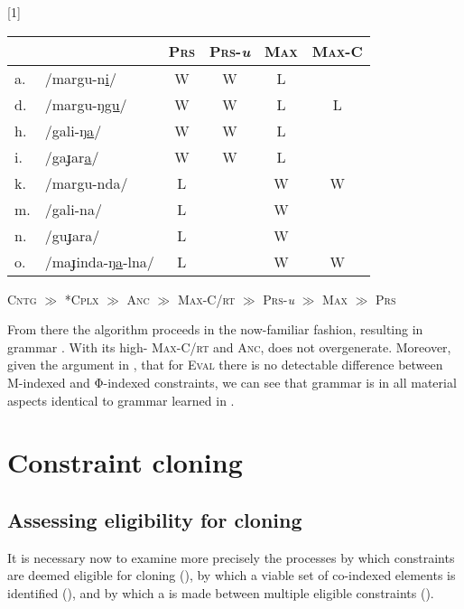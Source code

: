 \documentclass[output=paper,
modfonts
]{LSP/langsci}
\begin{document}
\ea \label{ex:round:49} 
\renewcommand*\arraystretch{1.15}
\scalebox{1}[1]{\begin{tabular}[t]{|ll||c|c||c|c|}
\firsthline  & & \textsc{Prs} & \textsc{Prs}-\textit{u} & \textsc{Max} & \textsc{Max-C} \\
\hline a. & /margu-n\underline{i}/ & W & W &  L & \\
\hline d. & /margu-ŋ\underline{gu}/ & W & W & L & L\\
\hline h. & /gali-ŋ\underline{a}/  & W & W & L & \\
\hline i. & /gaɟar\underline{a}/ & W & W & L & \\
\hline k. & /margu-nda/ &  L & & W & W\\
\hline m. & /gali-na/ &  L & & W & \\
\hline n. & /guɟara/ & L & & W & \\
\hline o. & /maɟinda-ŋ\underline{a}-lna/ & L & & W & W\\
\hline \end{tabular}} \renewcommand*\arraystretch{1}
\z

\ea \label{ex:round:50}
\textsc{Cntg} \textsc{${\gg}$}\textsc{} \textsc{*Cplx} \textsc{${\gg}$} \textsc{Anc} \textsc{${\gg}$} \textsc{Max-C/rt} \textsc{${\gg}$}\textsc{} \textsc{Prs-}\textit{u} ${\gg}$ \textsc{Max} \textsc{${\gg}$}\textsc{} \textsc{Prs}
\z

From there the algorithm proceeds in the now-familiar fashion, resulting in grammar . With its high- \textsc{Max-C/rt} and \textsc{Anc},  does not overgenerate. Moreover, given the argument in , that for \textsc{Eval} there is no detectable difference between M-indexed and Φ-indexed constraints, we can see that grammar  is in all material aspects identical to grammar  learned in .

\section[Constraint cloning]{Constraint cloning}\label{sec:round:8}
\label{bkm:Ref335669215}\subsection[Assessing eligibility for cloning]{Assessing eligibility for cloning}\label{sec:round:8.1}
\label{bkm:Ref335675122}
It is necessary now to examine more precisely the processes by which constraints are deemed eligible for cloning (), by which a viable set of co-indexed elements is identified (), and by which a  is made between multiple eligible constraints ().
\end{document}
